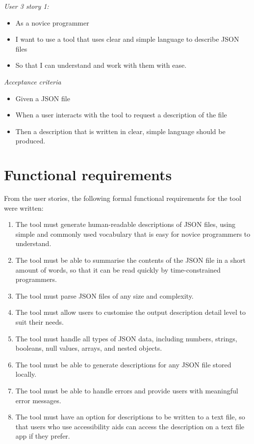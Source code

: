\documentclass{l4proj}
\begin{document}
\begin{small}
\begin{multicols}{2}
\textit{User 3 story 1:}
\begin{itemize}
    \item As a novice programmer
    \item I want to use a tool that uses clear and simple language to describe JSON files
    \item So that I can understand and work with them with ease.
\end{itemize}
\columnbreak
\textit{Acceptance criteria}
\begin{itemize}
    \item Given a JSON file
    \item When a user interacts with the tool to request a description of the file
    \item Then a description that is written in clear, simple language should be produced.
\end{itemize}
\end{multicols}
\end{small}



\section{Functional requirements}

From the user stories, the following formal functional requirements for the tool were written: 

\begin{small}
    

\begin{enumerate}
\item The tool must generate human-readable descriptions of JSON files, using simple and commonly used vocabulary that is easy for novice programmers to understand.
\item The tool must be able to summarise the contents of the JSON file in a short amount of words, so that it can be read quickly by time-constrained programmers.
\item The tool must parse JSON files of any size and complexity.
\item The tool must allow users to customise the output description detail level to suit their needs.
\item The tool must handle all types of JSON data, including numbers, strings, booleans, null values, arrays, and nested objects.
\item The tool must be able to generate descriptions for any JSON file stored locally.
\item The tool must be able to handle errors and provide users with meaningful error messages.
\item The tool must have an option for descriptions to be written to a text file, so that users who use accessibility aids can access the description on a text file app if they prefer.
\end{enumerate}
\end{small}
\end{document}

